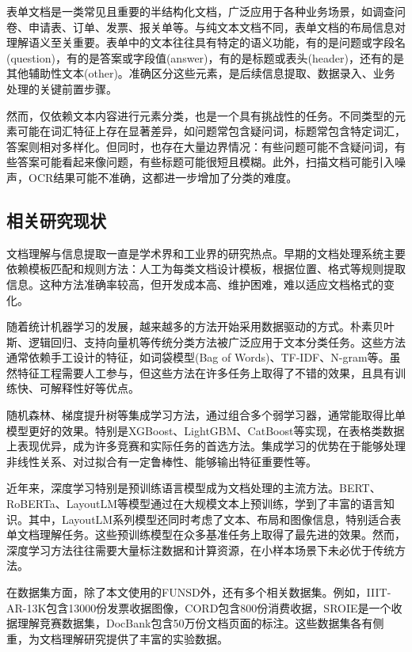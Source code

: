 \documentclass[12pt,a4paper]{article}
\begin{document}
表单文档是一类常见且重要的半结构化文档，广泛应用于各种业务场景，如调查问卷、申请表、订单、发票、报关单等。与纯文本文档不同，表单文档的布局信息对理解语义至关重要。表单中的文本往往具有特定的语义功能，有的是问题或字段名(question)，有的是答案或字段值(answer)，有的是标题或表头(header)，还有的是其他辅助性文本(other)。准确区分这些元素，是后续信息提取、数据录入、业务处理的关键前置步骤。

然而，仅依赖文本内容进行元素分类，也是一个具有挑战性的任务。不同类型的元素可能在词汇特征上存在显著差异，如问题常包含疑问词，标题常包含特定词汇，答案则相对多样化。但同时，也存在大量边界情况：有些问题可能不含疑问词，有些答案可能看起来像问题，有些标题可能很短且模糊。此外，扫描文档可能引入噪声，OCR结果可能不准确，这都进一步增加了分类的难度。

\subsection{相关研究现状}

文档理解与信息提取一直是学术界和工业界的研究热点。早期的文档处理系统主要依赖模板匹配和规则方法：人工为每类文档设计模板，根据位置、格式等规则提取信息。这种方法准确率较高，但开发成本高、维护困难，难以适应文档格式的变化。

随着统计机器学习的发展，越来越多的方法开始采用数据驱动的方式。朴素贝叶斯、逻辑回归、支持向量机等传统分类方法被广泛应用于文本分类任务\cite{Bishop2006}。这些方法通常依赖手工设计的特征，如词袋模型(Bag of Words)、TF-IDF、N-gram等\cite{Manning2008}。虽然特征工程需要人工参与，但这些方法在许多任务上取得了不错的效果，且具有训练快、可解释性好等优点。

随机森林、梯度提升树等集成学习方法，通过组合多个弱学习器，通常能取得比单模型更好的效果\cite{Breiman2001}。特别是XGBoost、LightGBM、CatBoost等实现，在表格类数据上表现优异，成为许多竞赛和实际任务的首选方法\cite{Chen2016}。集成学习的优势在于能够处理非线性关系、对过拟合有一定鲁棒性、能够输出特征重要性等。

近年来，深度学习特别是预训练语言模型成为文档处理的主流方法。BERT、RoBERTa、LayoutLM等模型通过在大规模文本上预训练，学到了丰富的语言知识\cite{Xu2020}。其中，LayoutLM系列模型还同时考虑了文本、布局和图像信息，特别适合表单文档理解任务。这些预训练模型在众多基准任务上取得了最先进的效果。然而，深度学习方法往往需要大量标注数据和计算资源，在小样本场景下未必优于传统方法。

在数据集方面，除了本文使用的FUNSD外\cite{Jaume2019}，还有多个相关数据集。例如，IIIT-AR-13K包含13000份发票收据图像，CORD包含800份消费收据，SROIE是一个收据理解竞赛数据集，DocBank包含50万份文档页面的标注。这些数据集各有侧重，为文档理解研究提供了丰富的实验数据。
\end{document}
